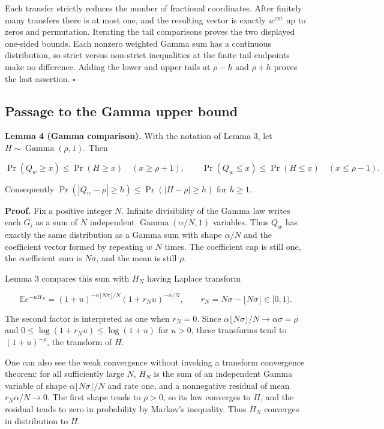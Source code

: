 \documentclass[10pt,a4paper]{article}
\begin{document}
Each transfer strictly reduces the number of fractional coordinates.
After finitely many transfers there is at most one, and the resulting
vector is exactly \(w^{\mathrm{ext}}\) up to zeros and permutation.
Iterating the tail comparisons proves the two displayed one-sided
bounds. Each nonzero weighted Gamma sum has a continuous distribution,
so strict versus non-strict inequalities at the finite tail endpoints
make no difference. Adding the lower and upper tails at \(\rho-h\) and
\(\rho+h\) proves the last assertion. \(\square\)

\subsection{Passage to the Gamma upper
bound}\label{passage-to-the-gamma-upper-bound}

\textbf{Lemma 4 (Gamma comparison).} With the notation of Lemma 3, let
\(H\sim\operatorname{Gamma}(\rho,1)\). Then

\[
\Pr(Q_w\ge x)\le\Pr(H\ge x)\quad(x\ge\rho+1),
\qquad
\Pr(Q_w\le x)\le\Pr(H\le x)\quad(x\le\rho-1).
\]

Consequently \(\Pr(|Q_w-\rho|\ge h)\le\Pr(|H-\rho|\ge h)\) for
\(h\ge1\).

\textbf{Proof.} Fix a positive integer \(N\). Infinite divisibility of
the Gamma law writes each \(G_i\) as a sum of \(N\) independent
\(\operatorname{Gamma}(\alpha/N,1)\) variables. Thus \(Q_w\) has exactly
the same distribution as a Gamma sum with shape \(\alpha/N\) and the
coefficient vector formed by repeating \(w\) \(N\) times. The
coefficient cap is still one, the coefficient sum is \(N\sigma\), and
the mean is still \(\rho\).

Lemma 3 compares this sum with \(H_N\) having Laplace transform

\[
\mathbb E e^{-uH_N}
=(1+u)^{-\alpha\lfloor N\sigma\rfloor/N}
(1+r_Nu)^{-\alpha/N},
\qquad r_N=N\sigma-\lfloor N\sigma\rfloor\in[0,1).
\]

The second factor is interpreted as one when \(r_N=0\). Since
\(\alpha\lfloor N\sigma\rfloor/N\to\alpha\sigma=\rho\) and
\(0\le\log(1+r_Nu)\le\log(1+u)\) for \(u>0\), these transforms tend to
\((1+u)^{-\rho}\), the transform of \(H\).

One can also see the weak convergence without invoking a transform
convergence theorem: for all sufficiently large \(N\), \(H_N\) is the
sum of an independent Gamma variable of shape
\(\alpha\lfloor N\sigma\rfloor/N\) and rate one, and a nonnegative
residual of mean \(r_N\alpha/N\to0\). The first shape tends to
\(\rho>0\), so its law converges to \(H\), and the residual tends to
zero in probability by Markov's inequality. Thus \(H_N\) converges in
distribution to \(H\).
\end{document}
